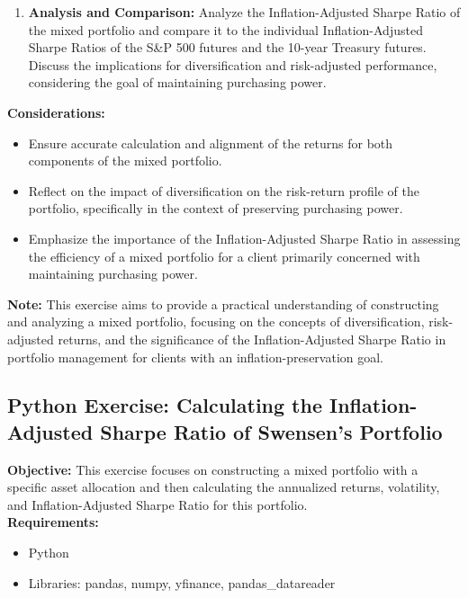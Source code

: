 \documentclass{article}
\begin{document}
\begin{enumerate}
    \item \textbf{Analysis and Comparison:} Analyze the Inflation-Adjusted Sharpe Ratio of the mixed portfolio and compare it to the individual Inflation-Adjusted Sharpe Ratios of the S\&P 500 futures and the 10-year Treasury futures. Discuss the implications for diversification and risk-adjusted performance, considering the goal of maintaining purchasing power.
\end{enumerate}

\textbf{Considerations:}
\begin{itemize}
    \item Ensure accurate calculation and alignment of the returns for both components of the mixed portfolio.
    \item Reflect on the impact of diversification on the risk-return profile of the portfolio, specifically in the context of preserving purchasing power.
    \item Emphasize the importance of the Inflation-Adjusted Sharpe Ratio in assessing the efficiency of a mixed portfolio for a client primarily concerned with maintaining purchasing power.
\end{itemize}

\textbf{Note:} This exercise aims to provide a practical understanding of constructing and analyzing a mixed portfolio, focusing on the concepts of diversification, risk-adjusted returns, and the significance of the Inflation-Adjusted Sharpe Ratio in portfolio management for clients with an inflation-preservation goal.

\subsection{Python Exercise: Calculating the Inflation-Adjusted Sharpe Ratio of Swensen's Portfolio}

\textbf{Objective:} This exercise focuses on constructing a mixed portfolio with a specific asset allocation and then calculating the annualized returns, volatility, and Inflation-Adjusted Sharpe Ratio for this portfolio. \\

\textbf{Requirements:}
\begin{itemize}
    \item Python
    \item Libraries: pandas, numpy, yfinance, pandas\_datareader
\end{itemize}
\end{document}

